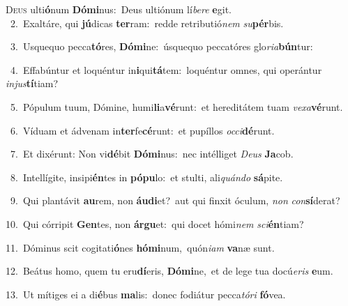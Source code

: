 \lettrine{\initial\textcolor{\initialcolor}{D}}{eus} ulti\-\textbf{ó}\-num \textbf{Dó}\-\textbf{mi}nus:~\star Deus ultiónum lí\-\textit{be}\-\textit{re} \textbf{e}\-git.\\
{\numbfont\textcolor{\numbcolor}{~2.}}~Exaltáre, qui \textbf{jú}\-dicas \textbf{ter}\-ram:~\star redde retributió\textit{nem} \textit{su}\-\textbf{pér}bis.\par
{\numbfont\textcolor{\numbcolor}{~3.}}~Usquequo pecca\-\textbf{tó}\-res, \textbf{Dó}\-\textbf{mi}ne:~\star úsquequo peccatóres glo\-\textit{ri}\-\textit{a}\textbf{bún}tur:\par
{\numbfont\textcolor{\numbcolor}{~4.}}~Effabúntur et loquéntur in\-\textbf{i}\-qui\-\textbf{tá}\-tem:~\star loquéntur omnes, qui operántur \textit{in}\-\textit{jus}\textbf{tí}tiam?\par
{\numbfont\textcolor{\numbcolor}{~5.}}~Pópulum tuum, Dómine, humi\-\textbf{li}\-a\-\textbf{vé}\-runt:~\star et hereditátem tuam \textit{ve}\-\textit{xa}\textbf{vé}runt.\par
{\numbfont\textcolor{\numbcolor}{~6.}}~Víduam et ádvenam in\-\textbf{ter}\-fe\-\textbf{cé}\-runt:~\star et pupíllos \textit{oc}\-\textit{ci}\textbf{dé}runt.\par
{\numbfont\textcolor{\numbcolor}{~7.}}~Et dixérunt: Non vi\-\textbf{dé}\-bit \textbf{Dó}\-\textbf{mi}nus:~\star nec intélliget \textit{De}\-\textit{us} \textbf{Ja}\-cob.\par
{\numbfont\textcolor{\numbcolor}{~8.}}~Intellígite, insipi\-\textbf{én}\-tes in \textbf{pó}\-\textbf{pu}lo:~\star et stulti, ali\-\textit{quán}\-\textit{do} \textbf{sá}\-pite.\par
{\numbfont\textcolor{\numbcolor}{~9.}}~Qui plantávit \textbf{au}\-rem, non \textbf{áu}\-\textbf{di}et?~\star aut qui finxit óculum, \textit{non} \textit{con}\-\textbf{sí}derat?\par
{\numbfont\textcolor{\numbcolor}{10.}}~Qui córripit \textbf{Gen}\-tes, non \textbf{ár}\-\textbf{gu}et:~\star qui docet hómi\textit{nem} \textit{sci}\-\textbf{én}tiam?\par
{\numbfont\textcolor{\numbcolor}{11.}}~Dóminus scit cogitati\-\textbf{ó}\-nes \textbf{hó}\-\textbf{mi}num,~\star quón\-\textit{i}\-\textit{am} \textbf{va}\-næ sunt.\par
{\numbfont\textcolor{\numbcolor}{12.}}~Beátus homo, quem tu eru\-\textbf{dí}\-eris, \textbf{Dó}\-\textbf{mi}ne,~\star et de lege tua docú\-\textit{e}\-\textit{ris} \textbf{e}\-um.\par
{\numbfont\textcolor{\numbcolor}{13.}}~Ut mítiges ei a di\-\textbf{é}\-bus \textbf{ma}\-lis:~\star donec fodiátur pecca\-\textit{tó}\-\textit{ri} \textbf{fó}\-vea.\par
